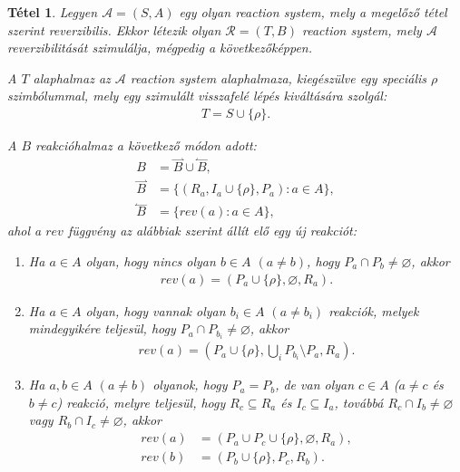 \documentclass[12pt]{article}
\theoremstyle{definition}
\theoremstyle{remark}
\theoremstyle{plain}
\newtheorem*{theorem*}{Tétel}
\let\emptyset\varnothing
\newcommand{\forwardhat}{\overset{\rightharpoonup}}
\newcommand{\backwardhat}{\overset{\leftharpoonup}}
\begin{document}
    \begin{theorem*}
        Legyen $\mathscr{A} = (S, A)$ egy olyan \textit{reaction system}, mely a megelőző tétel szerint reverzibilis. Ekkor létezik olyan $\mathscr{R} = (T, B)$ \textit{reaction system}, mely $\mathscr{A}$ reverzibilitását szimulálja, mégpedig a következőképpen.
        
        A $T$ alaphalmaz az $\mathscr{A}$ \textit{reaction system} alaphalmaza, kiegészülve egy speciális $\rho$ szimbólummal, mely egy szimulált visszafelé lépés kiváltására szolgál:
        \begin{align*}
            T = S \cup \{ \rho \}.
        \end{align*}

        A $B$ reakcióhalmaz a következő módon adott:
        \begin{align*}
            B &= \forwardhat B \cup \backwardhat B, \\
            \forwardhat B &= \{ (R_{a}, I_{a} \cup \{ \rho \}, P_{a}) : a \in A\}, \\
            \backwardhat B &= \{ \textit{rev}(a) : a \in A \},
        \end{align*}
        ahol a $\textit{rev}$ függvény az alábbiak szerint állít elő egy új reakciót:
        \begin{enumerate}[label={(\arabic*)}]
            \item
            Ha $a \in A$ olyan, hogy nincs olyan $b \in A$ $(a \neq b)$, hogy $P_{a} \cap P_{b} \neq \emptyset$, akkor
            \begin{align*}
                \textit{rev}(a) = (P_{a} \cup \{ \rho \} , \emptyset, R_{a}).
            \end{align*}

            \item
            Ha $a \in A$ olyan, hogy vannak olyan $b_{i} \in A$ $(a \neq b_{i})$ reakciók, melyek mindegyikére teljesül, hogy $P_{a} \cap P_{b_{i}} \neq \emptyset$, akkor
            \begin{align*}
                \textit{rev}(a) = (P_{a} \cup \{ \rho \}, \bigcup\limits_{i}P_{b_{i}} \setminus P_{a}, R_{a}).
            \end{align*}

            \item
            Ha $a, b \in A$ $(a \neq b)$ olyanok, hogy $P_{a} = P_{b}$, de van olyan $c \in A$ ($a \neq c$ és $b \neq c$) reakció, melyre teljesül, hogy $R_{c} \subseteq R_{a}$ és $I_{c} \subseteq I_{a}$, továbbá $R_{c} \cap I_{b} \neq \emptyset$ vagy $R_{b} \cap I_{c} \neq \emptyset$, akkor
            \begin{align*}
                \textit{rev}(a) &= (P_{a} \cup P_{c} \cup \{ \rho \}, \emptyset, R_{a}), \\
                \textit{rev}(b) &= (P_{b} \cup \{ \rho \}, P_{c}, R_{b}).
            \end{align*}
        \end{enumerate}
    \end{theorem*}
\end{document}
